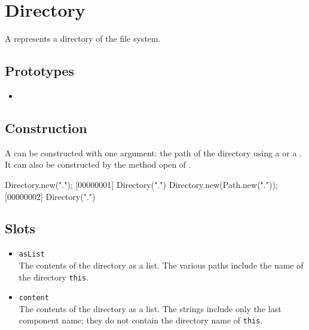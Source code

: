 \section{Directory}

A  represents a directory of the file system.

\subsection{Prototypes}
\begin{itemize}
\item {}
\end{itemize}

\subsection{Construction}

A  can be constructed with one argument: the path of
the directory using a  or a . It can
also be constructed by the method open of .

\begin{urbiscript}
Directory.new(".");
[00000001] Directory(".")
Directory.new(Path.new("."));
[00000002] Directory(".")
\end{urbiscript}

\subsection{Slots}
\begin{itemize}
\item \lstinline|asList|\\
  The contents of the directory as a  list.  The
  various paths include the name of the directory \lstinline|this|.

\item \lstinline|content|\\
  The contents of the directory as a  list.  The
  strings include only the last component name; they do not contain
  the directory name of \lstinline|this|.
\end{itemize}


